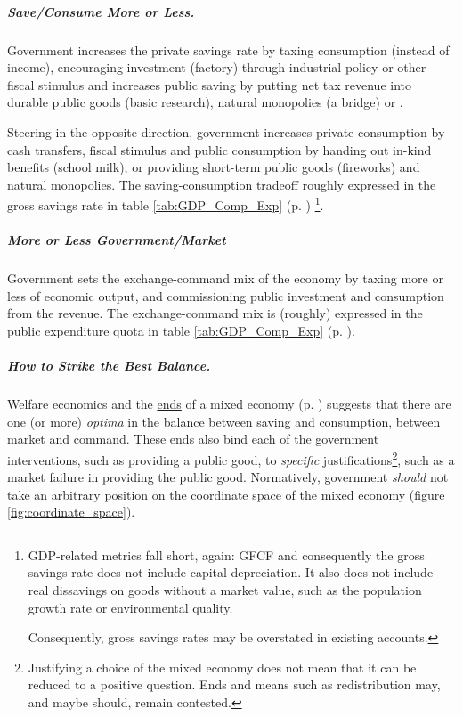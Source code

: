 \subparagraph[Save More or Less]{Save/Consume More or Less.} Government increases the private savings rate by taxing consumption (instead of income), encouraging investment (factory) through industrial policy or other fiscal stimulus and increases public saving by putting net tax revenue into durable public goods (basic research), natural monopolies (a bridge) or . 

Steering in the opposite direction, government increases private consumption by cash transfers, fiscal stimulus and public consumption by handing out in-kind benefits (school milk), or providing short-term public goods (fireworks) and natural monopolies. The saving-consumption tradeoff roughly expressed in the gross savings rate in table \ref{tab:GDP_Comp_Exp} (p. \pageref{tab:GDP_Comp_Exp}) \footnote{
	GDP-related metrics fall short, again: \gls{GFCF} and consequently the gross savings rate does not include capital depreciation. It also does not include real dissavings on goods without a market value, such as the population growth rate or environmental quality. 
	
	Consequently, gross savings rates may be overstated in existing accounts.}.


\subparagraph[Exchange-Command Mix]{More or Less Government/Market} Government sets the exchange-command mix of the economy by taxing more or less of economic output, and commissioning public investment and consumption from the revenue. The exchange-command mix is (roughly) expressed in the public expenditure quota in table \ref{tab:GDP_Comp_Exp} (p. \pageref{tab:GDP_Comp_Exp}).

\subparagraph[Optima]{How to Strike the Best Balance.} Welfare economics and the \hyperref[sec:ends]{ends} of a mixed economy (p. \pageref{sec:ends}) suggests that there are one (or more) \emph{optima} in the balance between saving and consumption, between market and command. These ends also bind each of the government interventions, such as providing a public good, to \emph{specific} justifications\footnote{
	Justifying a choice of the mixed economy does not mean that it can be reduced to a positive question. Ends and means such as redistribution may, and maybe should, remain contested.}, 
such as a market failure in providing the public good. Normatively, government \emph{should} not take an arbitrary position on \hyperref[fig:coordinate_space]{the coordinate space of the mixed economy} (figure \ref{fig:coordinate_space}). 

